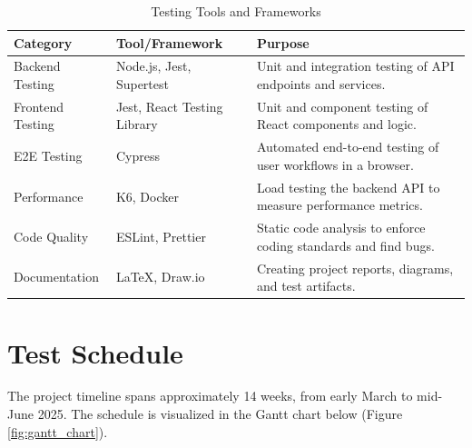 \begin{table}[H]
    \centering
    \caption{Testing Tools and Frameworks}
    \label{tab:testing_tools}
    \begin{tabular}{|l|l|p{6cm}|}
        \hline
        \textbf{Category} & \textbf{Tool/Framework} & \textbf{Purpose} \\
        \hline
        Backend Testing & Node.js, Jest, Supertest & Unit and integration testing of API endpoints and services. \\
        \hline
        Frontend Testing & Jest, React Testing Library & Unit and component testing of React components and logic. \\
        \hline
        E2E Testing & Cypress & Automated end-to-end testing of user workflows in a browser. \\
        \hline
        Performance & K6, Docker & Load testing the backend API to measure performance metrics. \\
        \hline
        Code Quality & ESLint, Prettier & Static code analysis to enforce coding standards and find bugs. \\
        \hline
        Documentation & LaTeX, Draw.io & Creating project reports, diagrams, and test artifacts. \\
        \hline
    \end{tabular}
\end{table}

\section{Test Schedule}
The project timeline spans approximately 14 weeks, from early March to mid-June 2025. The schedule is visualized in the Gantt chart below (Figure \ref{fig:gantt_chart}).


